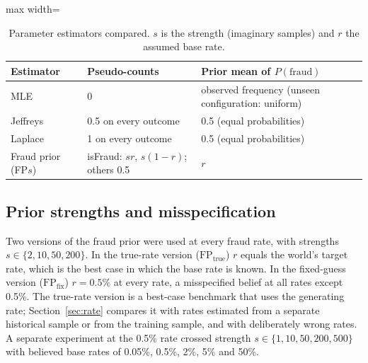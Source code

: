 \documentclass[final,5p,times,authoryear]{elsarticle}
\begin{document}
\begin{table}[H]
\centering\small
\begin{adjustbox}{max width=\linewidth}
\begin{tabular}{lll}\toprule
Estimator & Pseudo-counts & Prior mean of $P(\text{fraud})$\\\midrule
MLE & 0 & observed frequency (unseen configuration: uniform)\\
Jeffreys & 0.5 on every outcome & 0.5 (equal probabilities)\\
Laplace & 1 on every outcome & 0.5 (equal probabilities)\\
Fraud prior (FP$s$) & isFraud: $sr$, $s(1-r)$; others 0.5 & $r$\\\bottomrule
\end{tabular}
\end{adjustbox}
\caption{Parameter estimators compared. $s$ is the strength (imaginary samples) and $r$ the assumed base rate.}\label{tab:est}
\end{table}

\subsection{Prior strengths and misspecification}
Two versions of the fraud prior were used at every fraud rate, with strengths $s\in\{2,10,50,200\}$. In the true-rate version ($\mathrm{FP}_{\text{true}}$) $r$ equals the world's target rate, which is the best case in which the base rate is known. In the fixed-guess version ($\mathrm{FP}_{\text{fix}}$) $r=0.5\%$ at every rate, a misspecified belief at all rates except 0.5\%. The true-rate version is a best-case benchmark that uses the generating rate; Section~\ref{sec:rate} compares it with rates estimated from a separate historical sample or from the training sample, and with deliberately wrong rates. A separate experiment at the 0.5\% rate crossed strength $s\in\{1,10,50,200,500\}$ with believed base rates of 0.05\%, 0.5\%, 2\%, 5\% and 50\%.
\end{document}
